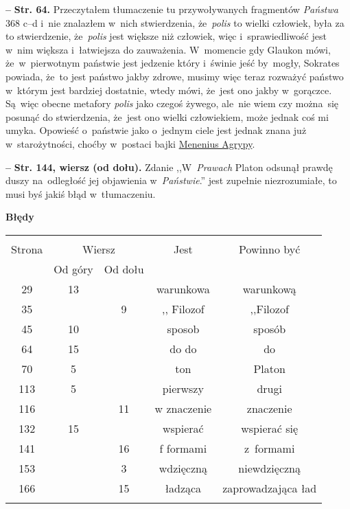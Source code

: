 \documentclass[a4paper,11pt]{article}
\newcommand{\spaceOne}{2em}
\newcommand{\spaceThree}{0.25em}
\newcommand{\tb}{\textbf}
\newcommand{\noi}{\noindent}
\newcommand{\start}{\noi \tb{--} {}}
\newcommand{\Center}[1]{\begin{center} #1 \end{center}}
\newcommand{\CenterTB}[1]{\Center{\tb{#1}}}
\newcommand{\Str}[1]{\tb{Str. #1.}}
\newcommand{\StrWd}[2]{\tb{Str. #1, wiersz #2 (od dołu).}}
\begin{document}
\vspace{\spaceThree}


\start \Str{64} Przeczytałem tłumaczenie tu przywoływanych fragmentów
\emph{Państwa} 368 c--d i~nie znalazłem w~nich stwierdzenia,
że~\emph{polis} to wielki człowiek, była za to stwierdzenie,
że~\emph{polis} jest większe niż człowiek, więc i~sprawiedliwość jest
w~nim większa i~łatwiejsza do zauważenia. W~momencie gdy Glaukon mówi,
że~w~pierwotnym państwie jest jedzenie który i~świnie jeść by~mogły,
Sokrates powiada, że~to jest państwo jakby zdrowe, musimy więc teraz
rozważyć państwo w~którym jest bardziej dostatnie, wtedy mówi, że~jest
ono jakby w~gorączce. Są~więc obecne metafory \emph{polis} jako czegoś
żywego, ale~nie wiem czy można~się posunąć do stwierdzenia, że~jest
ono wielki człowiekiem, może jednak coś mi umyka. Opowieść o~państwie
jako o~jednym ciele jest jednak znana już w~starożytności, choćby
w~postaci bajki
\href{https://en.wikipedia.org/wiki/Agrippa_Menenius_Lanatus_(consul_503_BC)}
{Menenius Agrypy}.

\vspace{\spaceThree}


\start \StrWd{144}{} Zdanie ,,W~\emph{Prawach} Platon odsunął prawdę
duszy na~odległość jej objawienia w~\emph{Państwie}.'' jest zupełnie
niezrozumiałe, to musi byś jakiś błąd w~tłumaczeniu.



\CenterTB{Błędy}
\begin{center}
  \begin{tabular}{|c|c|c|c|c|}
    \hline
    & \multicolumn{2}{c|}{} & & \\
    Strona & \multicolumn{2}{c|}{Wiersz}& Jest & Powinno być \\ \cline{2-3}
    & Od góry & Od dołu &  &  \\ \hline
    29 & 13 & & warunkowa & warunkową \\
    35 & & 9 & ,, Filozof %
           & ,,Filozof \\ %
    45 & 10 & & sposob & sposób \\
    64 & 15 & & do do & do \\
    70 & 5 & & ton & Platon \\
    113 & 5 & & pierwszy & drugi \\
    116 & & 11 & w znaczenie & znaczenie \\
    132 & 15 & & wspierać & wspierać się \\
    141 & & 16 & f formami & z~formami \\
    153 & & 3 & wdzięczną & niewdzięczną \\
    166 & & 15 & ładząca & zaprowadzająca ład \\
    & & & & \\ \hline
  \end{tabular}
\end{center}

\vspace{\spaceOne}



 {}
\end{document}
